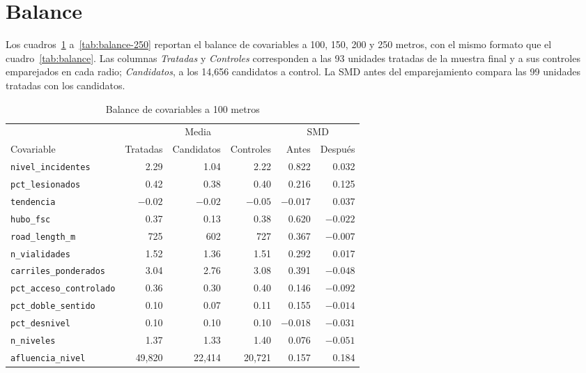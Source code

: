 \section{Balance}

\noindent Los cuadros~\ref{tab:balance-100} a~\ref{tab:balance-250} reportan el balance de covariables a 100, 150, 200 y 250 metros, con el mismo formato que el cuadro~\ref{tab:balance}. Las columnas \emph{Tratadas} y \emph{Controles} corresponden a las 93 unidades tratadas de la muestra final y a sus controles emparejados en cada radio; \emph{Candidatos}, a los 14,656 candidatos a control. La SMD antes del emparejamiento compara las 99 unidades tratadas con los candidatos.

\begin{table}[htbp]
    \centering
    \caption{Balance de covariables a 100 metros}
    \label{tab:balance-100}
    \footnotesize
    \setlength{\tabcolsep}{4pt}
    \begin{tabular}{l r r r r r}
        \toprule
        & \multicolumn{3}{c}{Media} & \multicolumn{2}{c}{SMD} \\
        \cmidrule(lr){2-4} \cmidrule(lr){5-6}
        Covariable & Tratadas & Candidatos & Controles & Antes & Después \\
        \midrule
        \texttt{nivel\_incidentes} & 2.29 & 1.04 & 2.22 & 0.822 & 0.032 \\
        \texttt{pct\_lesionados} & 0.42 & 0.38 & 0.40 & 0.216 & 0.125 \\
        \texttt{tendencia} & $-0.02$ & $-0.02$ & $-0.05$ & $-0.017$ & 0.037 \\
        \texttt{hubo\_fsc} & 0.37 & 0.13 & 0.38 & 0.620 & $-0.022$ \\
        \texttt{road\_length\_m} & 725 & 602 & 727 & 0.367 & $-0.007$ \\
        \texttt{n\_vialidades} & 1.52 & 1.36 & 1.51 & 0.292 & 0.017 \\
        \texttt{carriles\_ponderados} & 3.04 & 2.76 & 3.08 & 0.391 & $-0.048$ \\
        \texttt{pct\_acceso\_controlado} & 0.36 & 0.30 & 0.40 & 0.146 & $-0.092$ \\
        \texttt{pct\_doble\_sentido} & 0.10 & 0.07 & 0.11 & 0.155 & $-0.014$ \\
        \texttt{pct\_desnivel} & 0.10 & 0.10 & 0.10 & $-0.018$ & $-0.031$ \\
        \texttt{n\_niveles} & 1.37 & 1.33 & 1.40 & 0.076 & $-0.051$ \\
        \texttt{afluencia\_nivel} & 49,820 & 22,414 & 20,721 & 0.157 & 0.184 \\
        \bottomrule
    \end{tabular}
\end{table}

